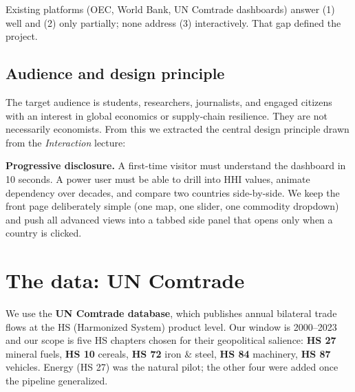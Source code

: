 \documentclass[a4paper,10pt]{article}
\begin{document}
Existing platforms (OEC, World Bank, UN Comtrade dashboards) answer (1) well and
(2) only partially; none address (3) interactively. That gap defined the project.

\subsection{Audience and design principle}

The target audience is students, researchers, journalists, and engaged
citizens with an interest in global economics or supply-chain resilience.
They are not necessarily economists. From this we extracted the central
design principle drawn from the \emph{Interaction} lecture:

\begin{decision}
\textbf{Progressive disclosure.}
A first-time visitor must understand the dashboard in 10 seconds. A power user
must be able to drill into HHI values, animate dependency over decades, and
compare two countries side-by-side. We keep the front page deliberately simple
(one map, one slider, one commodity dropdown) and push all advanced views into
a tabbed side panel that opens only when a country is clicked.
\end{decision}

\section{The data: UN Comtrade}

We use the \textbf{UN Comtrade database}, which publishes annual bilateral trade
flows at the HS (Harmonized System) product level. Our window is 2000--2023 and
our scope is five HS chapters chosen for their geopolitical salience:
\textbf{HS 27} mineral fuels, \textbf{HS 10} cereals, \textbf{HS 72} iron \&
steel, \textbf{HS 84} machinery, \textbf{HS 87} vehicles. Energy (HS 27) was
the natural pilot; the other four were added once the pipeline generalized.
\end{document}
